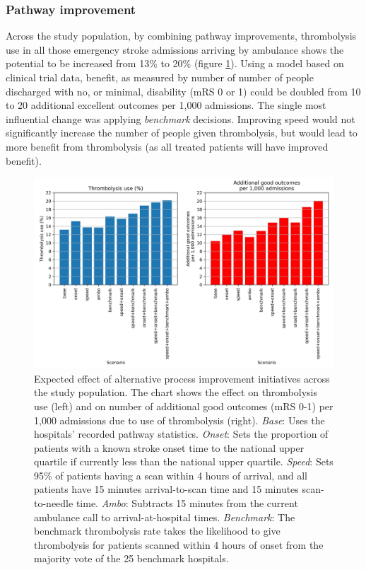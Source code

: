 \subsubsection{Pathway improvement}

Across the study population, by combining pathway improvements, thrombolysis use in all those emergency stroke admissions arriving by ambulance shows the potential to be increased from 13\% to 20\% (figure \ref{fig:scenarios_population}). Using a model based on clinical trial data, benefit, as measured by number of number of people discharged with no, or minimal, disability (mRS 0 or 1) could be doubled from 10 to 20 additional excellent outcomes per 1,000 admissions. The single most influential change was applying \textit{benchmark} decisions. Improving speed would not significantly increase the number of people given thrombolysis, but would lead to more benefit from thrombolysis (as all treated patients will have improved benefit).

\begin{figure}
    \centering
    \includegraphics[width=1\linewidth]{images/p5_sim.jpg}
    \caption{Expected effect of alternative process improvement initiatives across the study population. The chart shows the effect on thrombolysis use (left) and on number of additional good outcomes (mRS 0-1) per 1,000 admissions due to use of thrombolysis (right). \textit{Base}: Uses the hospitals’ recorded pathway statistics. \textit{Onset}: Sets the proportion of patients with a known stroke onset time to the national upper quartile if currently less than the national upper quartile. \textit{Speed}: Sets 95\% of patients having a scan within 4 hours of arrival, and all patients have 15 minutes arrival-to-scan time and 15 minutes scan-to-needle time. \textit{Ambo}: Subtracts 15 minutes from the current ambulance call to arrival-at-hospital times. \textit{Benchmark}: The benchmark thrombolysis rate takes the likelihood to give thrombolysis for patients scanned within 4 hours of onset from the majority vote of the 25 benchmark hospitals.}
    \label{fig:scenarios_population}
\end{figure}

